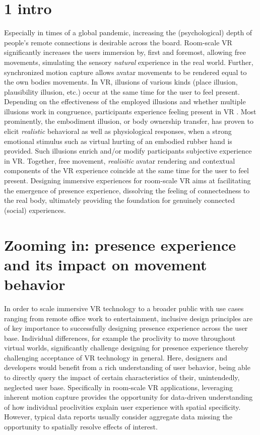 \section{1 intro}
Especially in times of a global pandemic, increasing the (psychological) depth of people's remote connections is desirable across the board. Room-scale VR significantly increases the users immersion by, first and foremost, allowing free movements, simulating the sensory \textit{natural} experience in the real world. Further, synchronized motion capture allows avatar movements to be rendered equal to the own bodies movements. In VR, illusions of various kinds (place illusion, plausibility illusion, etc.) occur at the same time for the user to feel present. Depending on the effectiveness of the employed illusions and whether multiple illusions work in congruence, participants experience feeling present in VR \cite{Gonzalez-Franco2017, Kilteni2012}. Most prominently, the embodiment illusion, or body ownership transfer, has proven to elicit \textit{realistic} behavioral as well as physiological responses, when a strong emotional stimulus such as virtual hurting of an embodied rubber hand is provided. Such illusions enrich and/or modify participants subjective experience in VR. Together, free movement, \textit{realisitic} avatar rendering and contextual components of the VR experience coincide at the same time for the user to feel present. Designing immersive experiences for room-scale VR aims at facilitating the emergence of presence experience, dissolving the feeling of connectedness to the real body, ultimately providing the foundation for genuinely connected (social) experiences. 

\section{Zooming in: presence experience and its impact on movement behavior}
In order to scale immersive VR technology to a broader public with use cases ranging from remote office work to entertainment, inclusive design principles are of key importance to successfully designing presence experience across the user base. Individual differences, for example the proclivity to move throughout virtual worlds, significantly challenge designing for presence experience thereby challenging acceptance of VR technology in general. Here, designers and developers would benefit from a rich understanding of user behavior, being able to directly query the impact of certain characteristics of their, unintendedly, neglected user base. Specifically in room-scale VR applications, leveraging inherent motion capture provides the opportunity for data-driven understanding of how individual proclivities explain user experience with spatial specificity. However, typical data reports usually consider aggregate data missing the opportunity to spatially resolve effects of interest.

